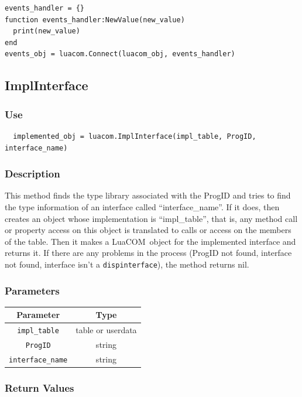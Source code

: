 \documentclass[11pt,a4paper,english]{report}
\newcommand{\ident}[1]{\mbox{\texttt{#1}}}
\newcommand{\techname}[1]{\mbox{#1}}
\newcommand{\luacom}{\techname{LuaCOM}}
\newcommand{\dispinterface}{\ident{dispinterface}}
\begin{document}
\begin{verbatim}
events_handler = {}
function events_handler:NewValue(new_value)
  print(new_value)
end
events_obj = luacom.Connect(luacom_obj, events_handler)
\end{verbatim}

\subsection*{ImplInterface}

\subsubsection*{Use}

  \begin{verbatim}
  implemented_obj = luacom.ImplInterface(impl_table, ProgID, interface_name)
  \end{verbatim}

\subsubsection*{Description}
This method finds the type library associated with the ProgID and
tries to find the type information of an interface called
``interface\_name''. If it does, then creates an object whose
implementation is ``impl\_table'', that is, any method call or property
access on this object is translated to calls or access on the members
of the table. Then it makes a \luacom\ object for the implemented
interface and returns it. If there are any problems in the process
(ProgID not found, interface not found, interface isn't a
\dispinterface), the method returns nil.

\subsubsection*{Parameters}

\begin{tabular}{|c|c|}
\hline
\bf Parameter & \bf Type    \\ \hline \hline
\verb+impl_table+ & table or userdata     \\ \hline
\verb+ProgID+ & string\\ \hline
\verb+interface_name+ & string\\ \hline
\end{tabular}

\subsubsection*{Return Values}
\end{document}
